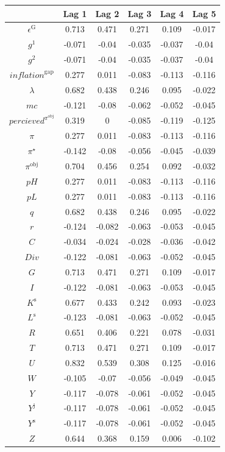 \begin{tabular}{c|ccccc|}
  & Lag 1 & Lag 2 & Lag 3 & Lag 4 & Lag 5\\
\hline
$\epsilon^{\mathrm{G}}$ & 0.713 & 0.471 & 0.271 & 0.109 & -0.017 \\
$g^{\mathrm{1}}$ & -0.071 & -0.04 & -0.035 & -0.037 & -0.04 \\
$g^{\mathrm{2}}$ & -0.071 & -0.04 & -0.035 & -0.037 & -0.04 \\
${i\!n\!f\!l\!a\!t\!i\!o\!n}^{\mathrm{gap}}$ & 0.277 & 0.011 & -0.083 & -0.113 & -0.116 \\
$\lambda$ & 0.682 & 0.438 & 0.246 & 0.095 & -0.022 \\
${m\!c}$ & -0.121 & -0.08 & -0.062 & -0.052 & -0.045 \\
${p\!e\!r\!c\!i\!e\!v\!e\!d}^{\pi^{\mathrm{obj}}}$ & 0.319 & 0 & -0.085 & -0.119 & -0.125 \\
$\pi$ & 0.277 & 0.011 & -0.083 & -0.113 & -0.116 \\
$\pi^{\star}$ & -0.142 & -0.08 & -0.056 & -0.045 & -0.039 \\
$\pi^{\mathrm{obj}}$ & 0.704 & 0.456 & 0.254 & 0.092 & -0.032 \\
${p\!H}$ & 0.277 & 0.011 & -0.083 & -0.113 & -0.116 \\
${p\!L}$ & 0.277 & 0.011 & -0.083 & -0.113 & -0.116 \\
$q$ & 0.682 & 0.438 & 0.246 & 0.095 & -0.022 \\
$r$ & -0.124 & -0.082 & -0.063 & -0.053 & -0.045 \\
$C$ & -0.034 & -0.024 & -0.028 & -0.036 & -0.042 \\
${D\!i\!v}$ & -0.122 & -0.081 & -0.063 & -0.052 & -0.045 \\
$G$ & 0.713 & 0.471 & 0.271 & 0.109 & -0.017 \\
$I$ & -0.122 & -0.081 & -0.063 & -0.053 & -0.045 \\
$K^{\mathrm{s}}$ & 0.677 & 0.433 & 0.242 & 0.093 & -0.023 \\
$L^{\mathrm{s}}$ & -0.123 & -0.081 & -0.063 & -0.052 & -0.045 \\
$R$ & 0.651 & 0.406 & 0.221 & 0.078 & -0.031 \\
$T$ & 0.713 & 0.471 & 0.271 & 0.109 & -0.017 \\
$U$ & 0.832 & 0.539 & 0.308 & 0.125 & -0.016 \\
$W$ & -0.105 & -0.07 & -0.056 & -0.049 & -0.045 \\
$Y$ & -0.117 & -0.078 & -0.061 & -0.052 & -0.045 \\
$Y^{\mathrm{j}}$ & -0.117 & -0.078 & -0.061 & -0.052 & -0.045 \\
$Y^{\mathrm{s}}$ & -0.117 & -0.078 & -0.061 & -0.052 & -0.045 \\
$Z$ & 0.644 & 0.368 & 0.159 & 0.006 & -0.102 \\
\hline
\end{tabular}



